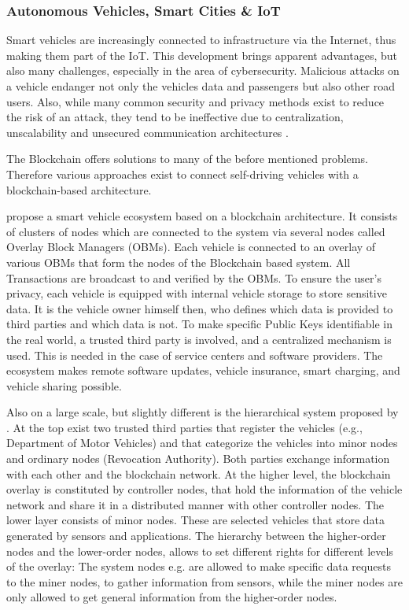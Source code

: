 \subsubsection{Autonomous Vehicles, Smart Cities \& IoT}
Smart vehicles are increasingly connected to infrastructure via the Internet, thus making them part of the IoT. This development brings apparent advantages, but also many challenges, especially in the area of cybersecurity. Malicious attacks on a vehicle endanger not only the vehicles data and passengers but also other road users. Also, while many common security and privacy methods exist to reduce the risk of an attack, they tend to be ineffective due to centralization, unscalability and unsecured communication architectures \cite{DorriSteger2017}.

The Blockchain offers solutions to many of the before mentioned problems. Therefore various approaches exist to connect self-driving vehicles with a blockchain-based architecture.

\citeauthor{DorriSteger2017} propose a smart vehicle ecosystem based on a blockchain architecture. It consists of clusters of nodes which are connected to the system via several nodes called Overlay Block Managers (OBMs). Each vehicle is connected to an overlay of various OBMs that form the nodes of the Blockchain based system. All Transactions are broadcast to and verified by the OBMs.
To ensure the user's privacy, each vehicle is equipped with internal vehicle storage to store sensitive data. It is the vehicle owner himself then, who defines which data is provided to third parties and which data is not.
To make specific Public Keys identifiable in the real world, a trusted third party is involved, and a centralized mechanism is used. This is needed in the case of service centers and software providers. The ecosystem makes remote software updates, vehicle insurance, smart charging, and vehicle sharing possible.

Also on a large scale, but slightly different is the hierarchical system proposed by \citeauthor{Sharma2017}. At the top exist two trusted third parties that register the vehicles (e.g., Department of Motor Vehicles) and that categorize the vehicles into minor nodes and ordinary nodes (Revocation Authority). Both parties exchange information with each other and the blockchain network. At the higher level, the blockchain overlay is constituted by controller nodes, that hold the information of the vehicle network and share it in a distributed manner with other controller nodes. The lower layer consists of minor nodes. These are selected vehicles that store data generated by sensors and applications. 
The hierarchy between the higher-order nodes and the lower-order nodes, allows to set different rights for different levels of the overlay: The system nodes e.g. are allowed to make specific data requests to the miner nodes, to gather information from sensors, while the miner nodes are only allowed to get general information from the higher-order nodes.

